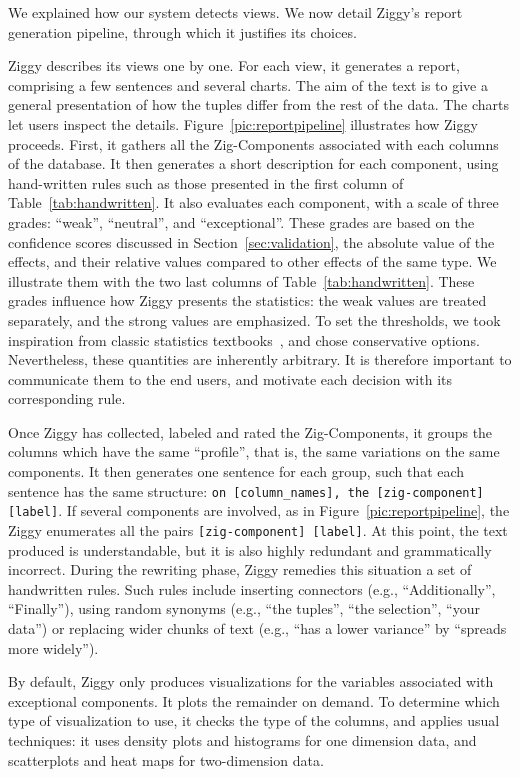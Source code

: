 We explained how our system detects views. We now detail Ziggy's report generation
pipeline, through which it justifies its choices. 

Ziggy describes its views one by one. For each view, it generates a report,
comprising a few sentences and several charts. The aim of the text is to give a
general presentation of how the tuples differ from the rest of the data. The
charts let users inspect the details.  Figure~\ref{pic:reportpipeline}
illustrates how Ziggy proceeds. First, it gathers all the Zig-Components
associated with each columns of the database. It then generates a short
description for each component, using hand-written rules such as those
presented in the first column of Table~\ref{tab:handwritten}. It also evaluates
each component, with a scale of three grades: ``weak'', ``neutral'', and
``exceptional''. These grades are based on the confidence scores discussed in
Section~\ref{sec:validation}, the absolute value of the effects, and their
relative values compared to other effects of the same type. We illustrate them 
with the two last columns of Table~\ref{tab:handwritten}. These grades
influence how Ziggy presents the statistics: the weak values are treated
separately, and the strong values are emphasized. To set the thresholds, we
took inspiration from classic statistics textbooks~\cite{cohen1977statistical},
and chose conservative options.  Nevertheless, these quantities are inherently
arbitrary. It is therefore important to communicate them to the end
users, and motivate each decision with its corresponding rule.

Once Ziggy has collected, labeled and rated the Zig-Comp\-onents, it  groups
the columns which have the same ``profile'', that is, the same variations on the
same components. It then generates one sentence for each group, such that
each sentence has the same structure: \texttt{on [column\_names], the
[zig-component] [label]}. If several components are involved, as in
Figure~\ref{pic:reportpipeline}, the Ziggy enumerates all the pairs
\texttt{[zig-component] [label]}. At this point, the text produced is
understandable, but it is also highly redundant and grammatically incorrect. During the
rewriting phase, Ziggy remedies this situation a set of handwritten rules. Such
rules include inserting connectors (e.g., ``Additionally'', ``Finally''), using
random synonyms (e.g., ``the tuples'', ``the selection'', ``your data'') or
replacing wider chunks of text (e.g., ``has a lower variance'' by ``spreads
more widely'').

By default, Ziggy only produces visualizations for the variables associated
with exceptional components. It plots the remainder on demand. To determine
which type of visualization to use, it checks the type of the columns, and
applies usual techniques: it uses density plots and histograms for one
dimension data, and scatterplots and heat maps for two-dimension data.

